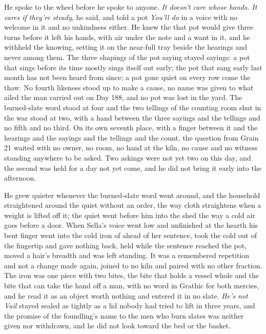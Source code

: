 He spoke to the wheel before he spoke to anyone. \emph{It doesn't care whose hands. It cares if they're steady}, he said, and told a pot \emph{You'll do} in a voice with no welcome in it and no unkindness either. He knew the  that pot would give three turns before it left his hands, with air under the note and a want in it, and he withheld the knowing, setting it on the near-full tray beside the hearings and never among them. The three shapings of the pot saying stayed sayings: a pot that sings before its time mostly sings itself out early; the pot that sang early last month has not been heard from since; a pot gone quiet on every row come the thaw. No fourth likeness stood up to make a cause, no name was given to what ailed the man carried out on Day 188, and no pot was lost in the yard. The burned-slate word stood at four and the two tellings of the counting room shut in the war stood at two, with a hand between the three sayings and the tellings and no fifth and no third. On its own seventh place, with a finger between it and the hearings and the sayings and the tellings and the count, the question from Grain 21 waited with no owner, no room, no hand at the kiln, no cause and no witness standing anywhere to be asked. Two askings were not yet two on this day, and the second was held for a day not yet come, and he did not bring it early into the afternoon.

He grew quieter whenever the burned-slate word went around, and the household straightened around the quiet without an order, the way cloth straightens when a weight is lifted off it; the quiet went before him into the shed the way a cold air goes before a door. When Sella's voice went low and unfinished at the hearth his bent finger went into the cold iron of  ahead of her sentence, took the cold out of the fingertip and gave nothing back, held while the sentence reached the pot, moved a hair's breadth and was left standing. It was a remembered repetition and not a change made again, joined to no kiln and paired with no other fraction. The iron was one piece with two bites, the bite that holds a vessel whole and the bite that can take the hand off a man, with no word in Grathic for both mercies, and he read it as an object worth nothing and entered it in no slate. \emph{He's not Vail} stayed sealed as tightly as a lid nobody had tried to lift in three years, and the promise of the foundling's name to the men who burn slates was neither given nor withdrawn, and he did not look toward the bed or the basket.

